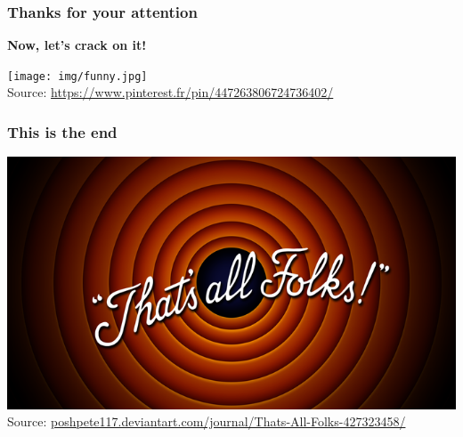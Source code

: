 \documentclass[svgnames]{beamer}
\begin{document}
\begin{frame}
    \frametitle{Thanks for your attention} %

            \begin{center}
                \textbf{Now, let's crack on it!}\\
                \vspace{2em}

                \texttt{[image: img/funny.jpg]}\\
                \vspace{1em}
                \tiny Source: \url{https://www.pinterest.fr/pin/447263806724736402/}
            \end{center}
\end{frame}

\begin{frame}
    \frametitle{This is the end} %

            \begin{center}
                
                \includegraphics[scale=0.15]{img/that_s_all_folks.png}\\
                \vspace{1em}
                \tiny Source: \url{poshpete117.deviantart.com/journal/Thats-All-Folks-427323458/}
            \end{center}
\end{frame}
\end{document}
